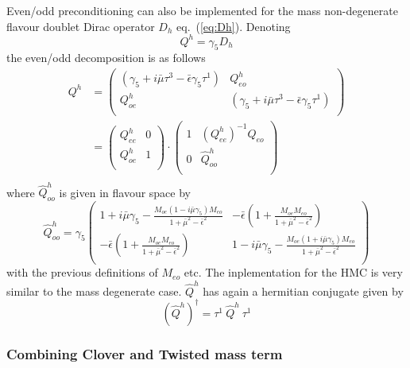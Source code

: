 Even/odd preconditioning can also be implemented for the mass
non-degenerate flavour doublet Dirac operator $D_h$
eq.~(\ref{eq:Dh}). Denoting 
\[
Q^h = \gamma_5 D_h
\]
the even/odd decomposition is as follows
\begin{equation}
  \label{eq:Dheo}
  \begin{split}
    Q^h &=
    \begin{pmatrix}
      (\gamma_5+i\bar\mu\tau^3 -\bar\epsilon\gamma_5\tau^1) & Q^h_{eo}\\
      Q^h_{oe} & (\gamma_5+i\bar\mu\tau^3 -\bar\epsilon\gamma_5\tau^1)\\
    \end{pmatrix} \\
    &=
    \begin{pmatrix}
      Q^h_{ee} & 0 \\
      Q^h_{oe} & 1 \\
    \end{pmatrix}
    \cdot
    \begin{pmatrix}
      1 & (Q^h_{ee})^{-1}Q_{eo} \\
      0 & \hat Q^h_{oo} \\
    \end{pmatrix} \\
  \end{split}
\end{equation}
where $\hat Q^h_{oo}$ is given in flavour space by
\begin{equation*}
  \hat Q^h_{oo} = \gamma_5
  \begin{pmatrix}
    1 + i\bar\mu\gamma_5 -
    \frac{M_{oe}(1-i\bar\mu\gamma_5)M_{eo}}{1+\bar\mu^2-\bar\epsilon^2} & 
    -\bar\epsilon\left(1+\frac{M_{oe}M_{eo}}{1+\bar\mu^2-\bar\epsilon^2}\right) \\
    -\bar\epsilon\left(1+\frac{M_{oe}M_{eo}}{1+\bar\mu^2-\bar\epsilon^2}\right) & 
    1 - i\bar\mu\gamma_5 -
    \frac{M_{oe}(1+i\bar\mu\gamma_5)M_{eo}}{1+\bar\mu^2-\bar\epsilon^2}\\
  \end{pmatrix}
\end{equation*}
with the previous definitions of $M_{eo}$ etc. The inplementation for
the HMC is very similar to the mass degenerate case. $\hat Q^h$ has
again a hermitian conjugate given by
\[
(\hat Q^h)^\dagger = \tau^1\ \hat Q^h\ \tau^1
\]

\subsubsection{Combining Clover and Twisted mass term}

